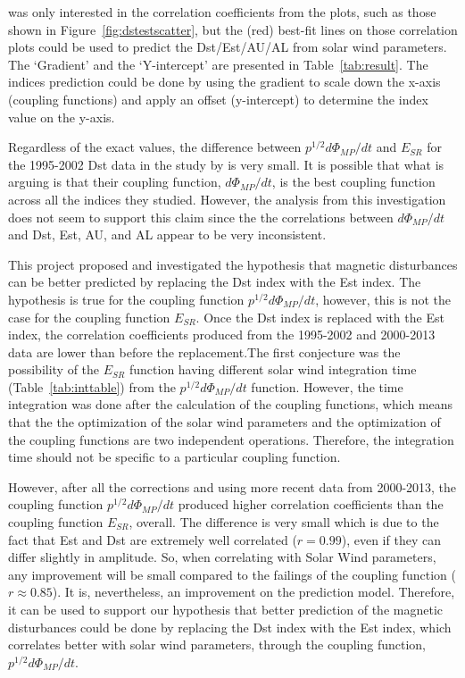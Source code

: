 \documentclass[12pt]{report} %
\begin{document}
\cite{newell07} was only interested in the correlation coefficients from the plots, such as those shown in Figure~\ref{fig:dstestscatter}, but the (red) best-fit lines on those correlation plots could be used to predict the Dst/Est/AU/AL from solar wind parameters. The `Gradient' and the `Y-intercept' are presented in Table~\ref{tab:result}. The indices prediction could be done by using the gradient to scale down the x-axis (coupling functions) and apply an offset (y-intercept) to determine the index value on the y-axis.

Regardless of the exact values, the difference between ${p^{1/2}d\Phi_{MP}/dt}$ and $E_{SR}$ for the 1995-2002 Dst data in the study by \cite{newell07} is very small. It is possible that what \cite{newell07}is arguing is that their coupling function, $d\Phi_{MP}/dt$, is the best coupling function across all the indices they studied. However, the analysis from this investigation does not seem to support this claim since the the correlations between $d\Phi_{MP}/dt$ and Dst, Est, AU, and AL appear to be very inconsistent.  

This project proposed and investigated the hypothesis that magnetic disturbances can be better predicted by replacing the Dst index with the Est index. The hypothesis is true for the coupling function $p^{1/2}d\Phi_{MP}/dt$, however, this is not the case for the coupling function $E_{SR}$. Once the Dst index is replaced with the Est index, the correlation coefficients produced from the 1995-2002 and 2000-2013 data are lower than before the replacement.The first conjecture was the possibility of the $E_{SR}$ function having different solar wind integration time (Table~\ref{tab:inttable}) from the ${p^{1/2}d\Phi_{MP}/dt}$ function. However, the time integration was done after the calculation of the coupling functions, which means that the the optimization of the solar wind parameters and the optimization of the coupling functions are two independent operations. Therefore, the integration time should not be specific to a particular coupling function.

However, after all the corrections and using more recent data from 2000-2013, the coupling function ${p^{1/2}d\Phi_{MP}/dt}$ produced higher correlation coefficients than the coupling function $E_{SR}$, overall. The difference is very small which is due to the fact that Est and Dst are extremely well correlated ($r=0.99$), even if they can differ slightly in amplitude. So, when correlating with Solar Wind parameters, any improvement will be small compared to the failings of the coupling function ($r  \approx 0.85$). It is, nevertheless, an improvement on the prediction model. Therefore, it can be used to support our hypothesis that better prediction of the magnetic disturbances could be done by replacing the Dst index with the Est index, which correlates better with solar wind parameters, through the coupling function, ${p^{1/2}d\Phi_{MP}/dt}$. 
\end{document}
